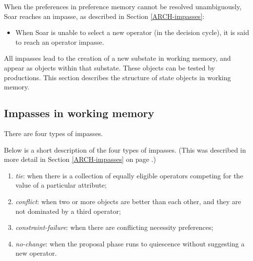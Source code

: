 When the preferences in preference memory cannot be resolved unambiguously, Soar reaches an impasse, as described in Section \ref{ARCH-impasses}:

\vspace{-12pt}
\begin{itemize}
\item When Soar is unable to select a new operator (in the decision cycle), it is said to reach an operator impasse.
\end{itemize}
\vspace{-8pt}

All impasses lead to the creation of a new substate in working memory, and appear as objects within that substate. These objects can be tested by productions. This section describes the structure of state objects in working memory.

\subsection{Impasses in working memory}
\label{SYNTAX-impasses-aug}

There are four types of impasses.

Below is a short description of the four types of impasses. (This was described in more detail in Section \ref{ARCH-impasses} on page \pageref{ARCH-impasses}.)

\vspace{-12pt}
\begin{enumerate}
\item \emph{tie}: when there is a collection of equally eligible operators competing for the value of a particular attribute;
\vspace{-8pt}
\item \emph{conflict}: when two or more objects are better than each other, and they are not dominated by a third operator;
\vspace{-8pt}
\item \emph{constraint-failure}: when there are conflicting necessity preferences;
\vspace{-8pt}
\item \emph{no-change}: when the proposal phase runs to quiescence without suggesting a new operator.
\vspace{-8pt}
\end{enumerate}

